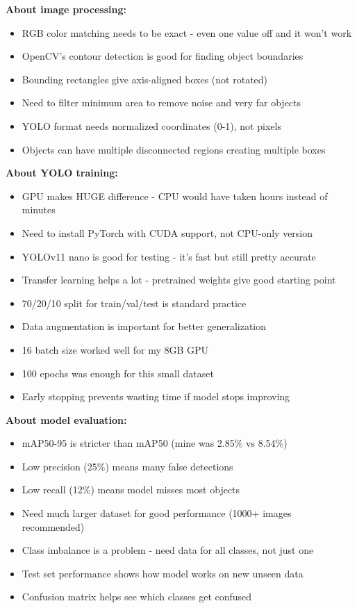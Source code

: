 \textbf{About image processing:}
\begin{itemize}
	\item RGB color matching needs to be exact - even one value off and it won't work
	\item OpenCV's contour detection is good for finding object boundaries
	\item Bounding rectangles give axis-aligned boxes (not rotated)
	\item Need to filter minimum area to remove noise and very far objects
	\item YOLO format needs normalized coordinates (0-1), not pixels
	\item Objects can have multiple disconnected regions creating multiple boxes
\end{itemize}

\textbf{About YOLO training:}
\begin{itemize}
	\item GPU makes HUGE difference - CPU would have taken hours instead of minutes
	\item Need to install PyTorch with CUDA support, not CPU-only version
	\item YOLOv11 nano is good for testing - it's fast but still pretty accurate
	\item Transfer learning helps a lot - pretrained weights give good starting point
	\item 70/20/10 split for train/val/test is standard practice
	\item Data augmentation is important for better generalization
	\item 16 batch size worked well for my 8GB GPU
	\item 100 epochs was enough for this small dataset
	\item Early stopping prevents wasting time if model stops improving
\end{itemize}

\textbf{About model evaluation:}
\begin{itemize}
	\item mAP50-95 is stricter than mAP50 (mine was 2.85\% vs 8.54\%)
	\item Low precision (25\%) means many false detections
	\item Low recall (12\%) means model misses most objects
	\item Need much larger dataset for good performance (1000+ images recommended)
	\item Class imbalance is a problem - need data for all classes, not just one
	\item Test set performance shows how model works on new unseen data
	\item Confusion matrix helps see which classes get confused
\end{itemize}

